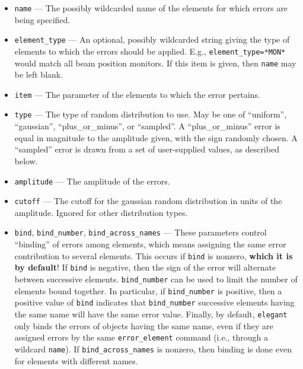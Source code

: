 \documentclass[11pt]{article}
\begin{document}
\begin{itemize}
\item \verb|name| --- The possibly wildcarded name of the elements for which errors are being specified.
\item \verb|element_type| --- An optional, possibly wildcarded string giving the type of elements to
 which the errors should be applied.  E.g., \verb|element_type=*MON*| would match all beam position monitors.
 If this item is given, then \verb|name| may be left blank.
\item \verb|item| --- The parameter of the elements to which the error pertains.
\item \verb|type| --- The type of random distribution to use.  May be one of ``uniform'', ``gaussian'', ``plus\_or\_minus'',
  or ``sampled''.
  A ``plus\_or\_minus'' error is equal in magnitude to the amplitude given, with the sign randomly chosen.
  A ``sampled'' error is drawn from a set of user-supplied values, as described below.
\item \verb|amplitude| --- The amplitude of the errors.
\item \verb|cutoff| --- The cutoff for the gaussian random distribution in units of the amplitude.  Ignored for other distribution types.
\item \verb|bind|, \verb|bind_number|, \verb|bind_across_names| ---
These parameters control ``binding'' of errors among elements, which
means assigning the same error contribution to several elements.  This
occurs if \verb|bind| is nonzero, {\bf which it is by default}! If \verb|bind| is negative, then the
sign of the error will alternate between successive elements.
\verb|bind_number| can be used to limit the number of elements bound
together. In particular, if \verb|bind_number| is positive, then a
positive value of \verb|bind| indicates that \verb|bind_number|
successive elements having the same name will have the same error
value.  Finally, by default, {\tt elegant} only binds the errors of
objects having the same name, even if they are assigned errors by 
the same \verb|error_element| command (i.e., through a wildcard \verb|name|).
If \verb|bind_across_names| is nonzero, then binding is done even for elements
with different names.


\end{itemize}
\end{document}
